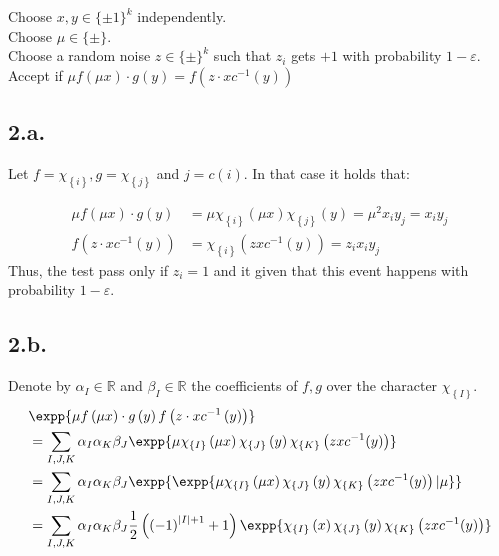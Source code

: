 \documentclass{article}
\newcommand{\Chi}[1]{\chi_{ \left\{ #1  \right\} } }
\begin{document}
\begin{algorithm}[H]
  Choose $x,y \in \{\pm1\}^{k}$ independently. \\
  Choose $\mu \in \{\pm\}$. \\ 
  Choose a random noise $z \in \{\pm\}^{k}$ such that $z_{i}$ gets $+1$ with probability $1-\varepsilon$.  \\
  Accept if $\mu f\left( \mu x \right) \cdot g\left( y \right) = f\left(z \cdot x c^{-1}\left( y \right)  \right)$

\end{algorithm}


\subsection{2.a.} Let $f = \Chi{i}, g = \Chi{j}$ and $j = c(i)$. In that case it holds that: 

\begin{equation*}
  \begin{split}
    \mu f\left( \mu x \right) \cdot g\left( y \right)  &= \mu \Chi{i}\left( \mu x \right)\Chi{j}\left( y \right) = \mu^{2}x_{i}y_{j} = x_{i}y_{j} \\ 
    f\left(z \cdot x c^{-1}\left( y \right)  \right) & = \Chi{i}\left( zx c^{-1}(y) \right) = z_{i}x_{i}y_{j} 
  \end{split}
\end{equation*}
Thus, the test pass only if $z_{i} = 1$ and it given that this event happens with probability $1-\varepsilon$. 

\subsection{2.b.} 
Denote by $\alpha_{I} \in \mathbb{R}$ and $\beta_{I} \in \mathbb{R}$ the coefficients of $f,g$ over the character $\Chi{I}$.  
\begin{equation*}
  \begin{split}
    & \expp{\mu f\left( \mu x \right) \cdot g\left( y \right)f\left(z \cdot x c^{-1}\left( y \right)  \right)} \\
    & = \sum_{I,J,K}\alpha_{I}\alpha_{K}\beta_{J}\expp{ \mu \Chi{I}\left( \mu x \right)\Chi{J}\left( y \right) \Chi{K}\left( zx c^{-1}(y) \right) } \\
    & = \sum_{I,J,K}\alpha_{I}\alpha_{K}\beta_{J}\expp{\expp{ \mu \Chi{I}\left( \mu x \right)\Chi{J}\left( y \right) \Chi{K}\left( zx c^{-1}(y) \right)|\mu}} \\ 
    & = \sum_{I,J,K}\alpha_{I}\alpha_{K}\beta_{J}\frac{1}{2}\left( \left( - 1 \right)^{|I|+1}  + 1\right) \expp{  \Chi{I}\left(  x \right)\Chi{J}\left( y \right) \Chi{K}\left( zx c^{-1}(y) \right) }  
  \end{split}
\end{equation*}
\end{document}
